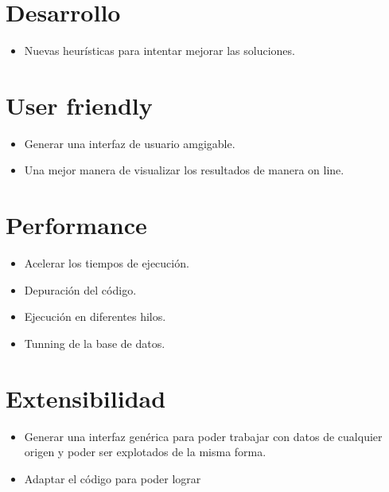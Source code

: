 \section{Desarrollo}
\begin{itemize}
 \item Nuevas heurísticas para intentar mejorar las soluciones.
\end{itemize}


\section{User friendly}
\begin{itemize}
 \item Generar una interfaz de usuario amgigable.
 \item Una mejor manera de visualizar los resultados de manera on line.
\end{itemize}

\section{Performance}
\begin{itemize}
 \item Acelerar los tiempos de ejecución.
 \item Depuración del código.
 \item Ejecución en diferentes hilos.
 \item Tunning de la base de datos.
\end{itemize}

\section{Extensibilidad}
\begin{itemize}
 \item Generar una interfaz genérica para poder trabajar con datos de cualquier origen y poder ser explotados de la misma forma.
 \item Adaptar el código para poder lograr 
\end{itemize}
